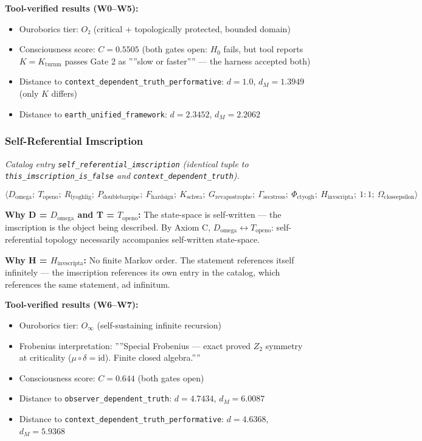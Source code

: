 \documentclass[12pt,a4paper]{article}
\begin{document}
\textbf{Tool-verified results (W0--W5):}

\begin{itemize}
    \item Ouroborics tier: $O₂$ (critical + topologically protected, bounded domain)
    \item Consciousness score: $C = 0.5505$ (both gates open: $H_0$ fails, but tool reports $K = K_{\text{turnm}}$ passes Gate 2 as ''''slow or faster'''' --- the harness accepted both)
    \item Distance to \texttt{context\_dependent\_truth\_performative}: $d = 1.0$, $d_M = 1.3949$ (only $K$ differs)
    \item Distance to \texttt{earth\_unified\_framework}: $d = 2.3452$, $d_M = 2.2062$
\end{itemize}

\subsubsection{Self-Referential Imscription}

\emph{Catalog entry \texttt{self\_referential\_imscription} (identical tuple to \texttt{this\_imscription\_is\_false} and \texttt{context\_dependent\_truth}).}

\[\langle D_{\text{omega}};\ T_{\text{openo}};\ R_{\text{lyoghlig}};\ P_{\text{doublebarpipe}};\ F_{\text{hardsign}};\ K_{\text{schwa}};\ G_{\text{revapostrophe}};\ \Gamma_{\text{secstress}};\ \Phi_{\text{ctyogh}};\ H_{\text{invscripta}};\ 1{:}1;\ \Omega_{\text{closeepsilon}} \rangle\]

\textbf{Why D = $D_{\text{omega}}$ and T = $T_{\text{openo}}$:} The state-space is self-written --- the imscription is the object being described. By Axiom C, $D_{\text{omega}} \leftrightarrow T_{\text{openo}}$: self-referential topology necessarily accompanies self-written state-space.

\textbf{Why H = $H_{\text{invscripta}}$:} No finite Markov order. The statement references itself infinitely --- the imscription references its own entry in the catalog, which references the same statement, ad infinitum.

\textbf{Tool-verified results (W6--W7):}

\begin{itemize}
    \item Ouroborics tier: $O_{\infty}$ (self-sustaining infinite recursion)
    \item Frobenius interpretation: ''''Special Frobenius --- exact proved $Z_2$ symmetry at criticality ($\mu \circ \delta = \text{id}$). Finite closed algebra.''''
    \item Consciousness score: $C = 0.644$ (both gates open)
    \item Distance to \texttt{observer\_dependent\_truth}: $d = 4.7434$, $d_M = 6.0087$
    \item Distance to \texttt{context\_dependent\_truth\_performative}: $d = 4.6368$, $d_M = 5.9368$
\end{itemize}
\end{document}
